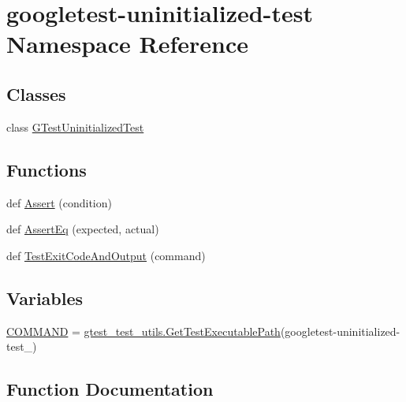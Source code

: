 \hypertarget{namespacegoogletest-uninitialized-test}{}\section{googletest-\/uninitialized-\/test Namespace Reference}
\label{namespacegoogletest-uninitialized-test}
\subsection*{Classes}
\begin{DoxyCompactItemize}
\item 
class \mbox{\hyperlink{classgoogletest-uninitialized-test_1_1GTestUninitializedTest}{G\+Test\+Uninitialized\+Test}}
\end{DoxyCompactItemize}
\subsection*{Functions}
\begin{DoxyCompactItemize}
\item 
def \mbox{\hyperlink{namespacegoogletest-uninitialized-test_af02e731714736167bb758ba94b8ec109}{Assert}} (condition)
\item 
def \mbox{\hyperlink{namespacegoogletest-uninitialized-test_a8b48f5e81e60f11030082240561c7f94}{Assert\+Eq}} (expected, actual)
\item 
def \mbox{\hyperlink{namespacegoogletest-uninitialized-test_a70d1a3c3521654597facb5344ee1c968}{Test\+Exit\+Code\+And\+Output}} (command)
\end{DoxyCompactItemize}
\subsection*{Variables}
\begin{DoxyCompactItemize}
\item 
\mbox{\hyperlink{namespacegoogletest-uninitialized-test_a2526f9a60be6da67bfed64cac54d836b}{C\+O\+M\+M\+A\+ND}} = \mbox{\hyperlink{namespacegtest__test__utils_a89ed3717984a80ffbb7a9c92f71b86a2}{gtest\+\_\+test\+\_\+utils.\+Get\+Test\+Executable\+Path}}(\textquotesingle{}googletest-\/uninitialized-\/test\+\_\+\textquotesingle{})
\end{DoxyCompactItemize}


\subsection{Function Documentation}
\mbox{\label{namespacegoogletest-uninitialized-test_af02e731714736167bb758ba94b8ec109}} 
